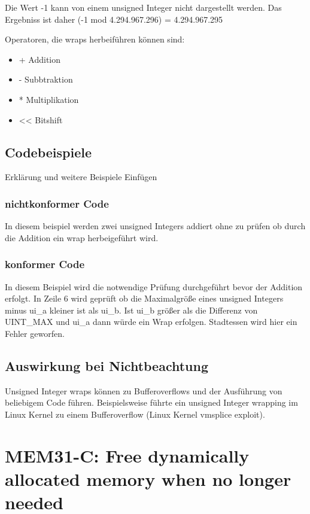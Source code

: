 \documentclass[12pt]{article}
\begin{document}
Die Wert -1 kann von einem unsigned Integer nicht dargestellt werden. Das Ergebniss ist daher (-1 mod 4.294.967.296) = 4.294.967.295

Operatoren, die wraps herbeiführen können sind:\\
\begin{itemize}
    \item + Addition
    \item - Subbtraktion
    \item * Multiplikation
    \item << Bitshift
\end{itemize}
\subsection{Codebeispiele}
Erklärung und weitere Beispiele Einfügen
\subsubsection{nichtkonformer Code}

In diesem beispiel werden zwei unsigned Integers addiert ohne zu prüfen ob durch die Addition ein wrap herbeigeführt wird.
\subsubsection{konformer Code}

In diesem Beispiel wird die notwendige Prüfung durchgeführt bevor der Addition erfolgt. In Zeile 6 wird geprüft ob die Maximalgröße eines unsigned Integers minus ui\_a kleiner ist als ui\_b. Ist ui\_b größer als die Differenz von UINT\_MAX und ui\_a dann würde ein Wrap erfolgen. Stadtessen wird hier ein Fehler geworfen.

\subsection{Auswirkung bei Nichtbeachtung}
Unsigned Integer wraps können zu Bufferoverflows und der Ausführung von beliebigem  Code führen.
Beispielsweise führte ein unsigned Integer wrapping im Linux Kernel zu einem Bufferoverflow (Linux Kernel vmsplice exploit).

\newpage
\section{MEM31-C: Free dynamically allocated memory when no longer needed}
\end{document}
